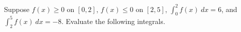 \documentclass[12pt, addpoints]{exam}
\newcommand{\vstr}{\vspace{\stretch{1}}}
\theoremstyle{plain}
\begin{document}
\begin{questions}
\newpage
\question Suppose $f(x)\geq 0$ on $[0,2]$, $f(x)\leq 0$ on $[2,5]$, $\int_0^2f(x)\ dx=6$, and $\int_2^5f(x)\ dx=-8$.  Evaluate the following integrals.



\end{questions}
\end{document}
